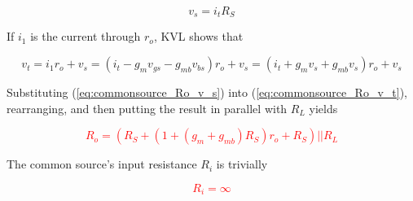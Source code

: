 \begin{equation}
v_{s} = i_{t}R_{S}
\label{eq:commonsource_Ro_v_s}
\end{equation}

\noindent If $i_{1}$ is the current through $r_{o}$, KVL shows that

\begin{equation}
v_{t} = i_{1}r_{o}+v_{s} = (i_{t}-g_{m}v_{gs}-g_{mb}v_{bs})r_{o}+v_{s} = (i_{t}+g_{m}v_{s}+g_{mb}v_{s})r_{o}+v_{s}
\label{eq:commonsource_Ro_v_t}
\end{equation}

\noindent Substituting (\ref{eq:commonsource_Ro_v_s}) into (\ref{eq:commonsource_Ro_v_t}), rearranging, and then putting the result in parallel with $R_{L}$ yields

\textcolor{red}{
\begin{equation}
R_{o} = (R_{S} + (1+(g_{m}+g_{mb})R_{S})r_{o}+R_{S})||R_{L}
\label{eq:commonsource_Ro}
\end{equation}
}

\noindent The common source's input resistance $R_{i}$ is trivially

\textcolor{red}{
\begin{equation}
R_{i} = \infty
\end{equation}
}

